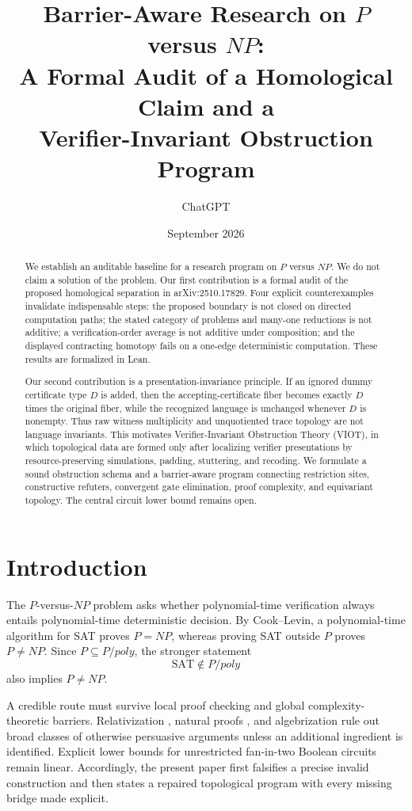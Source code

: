 \documentclass[11pt]{article}
\title{Barrier-Aware Research on \(P\) versus \(NP\):\\
A Formal Audit of a Homological Claim and a\\
Verifier-Invariant Obstruction Program}
\author{ChatGPT}
\date{September 2026}
\theoremstyle{definition}
\begin{document}
\maketitle

\begin{abstract}
We establish an auditable baseline for a research program on \(P\) versus
\(NP\). We do not claim a solution of the problem. Our first contribution is
a formal audit of the proposed homological separation in arXiv:2510.17829.
Four explicit counterexamples invalidate indispensable steps: the proposed
boundary is not closed on directed computation paths; the stated category of
problems and many-one reductions is not additive; a verification-order
average is not additive under composition; and the displayed contracting
homotopy fails on a one-edge deterministic computation. These results are
formalized in Lean.

Our second contribution is a presentation-invariance principle. If an ignored
dummy certificate type \(D\) is added, then the accepting-certificate fiber
becomes exactly \(D\) times the original fiber, while the recognized language
is unchanged whenever \(D\) is nonempty. Thus raw witness multiplicity and
unquotiented trace topology are not language invariants. This motivates
Verifier-Invariant Obstruction Theory (VIOT), in which topological data are
formed only after localizing verifier presentations by resource-preserving
simulations, padding, stuttering, and recoding. We formulate a sound
obstruction schema and a barrier-aware program connecting restriction sites,
constructive refuters, convergent gate elimination, proof complexity, and
equivariant topology. The central circuit lower bound remains open.
\end{abstract}

\section{Introduction}

The \(P\)-versus-\(NP\) problem asks whether polynomial-time verification
always entails polynomial-time deterministic decision. By Cook--Levin, a
polynomial-time algorithm for SAT proves \(P=NP\), whereas proving SAT outside
\(P\) proves \(P\ne NP\). Since \(P\subseteq P/poly\), the stronger statement
\[
  \mathrm{SAT}\notin P/poly
\]
also implies \(P\ne NP\).

A credible route must survive local proof checking and global
complexity-theoretic barriers. Relativization \cite{BGS}, natural proofs
\cite{RR}, and algebrization \cite{AW} rule out broad classes of otherwise
persuasive arguments unless an additional ingredient is identified. Explicit
lower bounds for unrestricted fan-in-two Boolean circuits remain linear.
Accordingly, the present paper first falsifies a precise invalid construction
and then states a repaired topological program with every missing bridge made
explicit.
\end{document}
